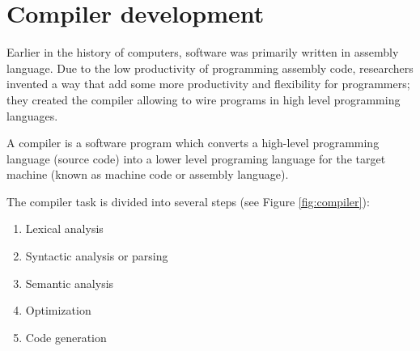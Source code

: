 \documentclass[
  oneside,
  11pt, a4paper,
  footinclude=true,
  headinclude=true,
  cleardoublepage=empty
]{scrbook}
\begin{document}





\chapter{Compiler development}
Earlier in the history of computers, software was primarily written in assembly language. Due to the low productivity of programming assembly code, researchers invented a way that add some more productivity and flexibility for programmers; they created the compiler allowing to wire programs in high level programming languages.

A compiler is a software program which converts a high-level programming language (source code) into a lower level programing language for the target machine (known as machine code or assembly language).

The compiler task is divided into several steps (see Figure \ref{fig:compiler}):
\begin{enumerate}
  \item Lexical analysis
  \item Syntactic analysis or parsing
  \item Semantic analysis
  \item Optimization
  \item Code generation
\end{enumerate}
\end{document}
